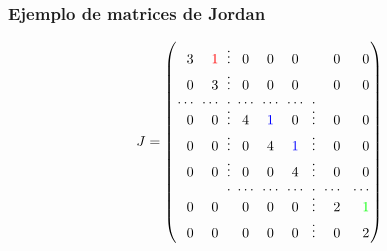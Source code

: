 \begin{frame}\frametitle{Ejemplo de matrices de Jordan}
	
	\[
	J = 
	\left(
	\begin{array}{@{\hspace{0.1\tabcolsep}}r@{\hspace{\tabcolsep}}r@{\hspace{\tabcolsep}}r@{\hspace{0.8\tabcolsep}}c@{\hspace{\tabcolsep}}c@{\hspace{\tabcolsep}}c@{\hspace{\tabcolsep}}l@{\hspace{\tabcolsep}}r@{\hspace{1.5\tabcolsep}}r@{\hspace{0.1\tabcolsep}}}
	3 & {\color{red} 1} & \vdots & 0 & 0 & 0 &  & 0 & 0 \\[0mm]
	0 & 3 & \vdots & 0 & 0 & 0 &  & 0 & 0 \\[0mm]
	\cdots & \cdots & \cdot & \cdots & \cdots & \cdots & \cdot &  &  \\[-2mm]
	0 & 0 & \vdots & 4 & {\color{blue} 1} & 0 & \vdots & 0 & 0 \\[0mm]
	0 & 0 & \vdots & 0 & 4 & {\color{blue} 1} & \vdots & 0 & 0 \\[0mm]
	0 & 0 & \vdots & 0 & 0 & 4 & \vdots & 0 & 0 \\[0mm]
	 & & \cdot & \cdots & \cdots & \cdots & \cdot & \cdots & \cdots \\[-2mm]	
	0 & 0 &  & 0 & 0 & 0 & \vdots & 2 & {\color{green} 1} \\[0mm]
	0 & 0 &  & 0 & 0 & 0 & \vdots & 0 & 2 \\[0mm]
	\end{array}
	\right) 	
	\]
	
\end{frame}


\subsection{}

